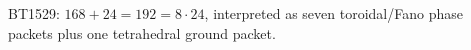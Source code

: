\begin{center}\small
BT1529: $168+24=192=8\cdot24$, interpreted as seven toroidal/Fano phase packets plus one tetrahedral ground packet.
\end{center}
